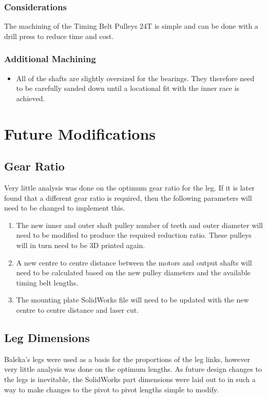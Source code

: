 \documentclass[11pt, titlepage]{article}
\begin{document}
\subsubsection{Considerations}
The machining of the Timing Belt Pulleys 24T is simple and can be done with a drill press to reduce time and cost.

\subsubsection{Additional Machining}
\begin{itemize}
	\item All of the shafts are slightly oversized for the bearings. They therefore need to be carefully sanded down until a locational fit with the inner race is achieved.
\end{itemize}

\newpage
\section{Future Modifications}
\subsection{Gear Ratio}
Very little analysis was done on the optimum gear ratio for the leg. If it is later found that a different gear ratio is required, then the following parameters will need to be changed to implement this.

\begin{enumerate}
	\item The new inner and outer shaft pulley number of teeth and outer diameter will need to be modified to produce the required reduction ratio. These pulleys will in turn need to be 3D printed again.
	\item A new centre to centre distance between the motors and output shafts will need to be calculated based on the new pulley diameters and the available timing belt lengths.
	\item The mounting plate SolidWorks file will need to be updated with the new centre to centre distance and laser cut. 
\end{enumerate}

\subsection{Leg Dimensions}
Baleka's legs were used as a basis for the proportions of the leg links, however very little analysis was done on the optimum lengths. As future design changes to the legs is inevitable, the SolidWorks part dimensions were laid out to in such a way to make changes to the pivot to pivot lengths simple to modify.
\end{document}
